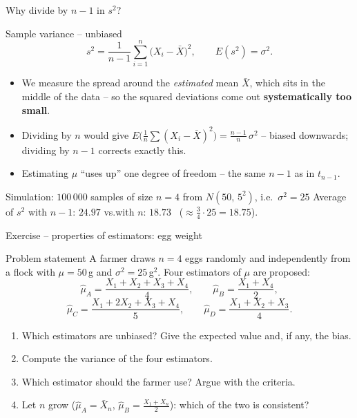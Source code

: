 \documentclass[aspectratio=169,11pt]{beamer}
\begin{document}
\begin{frame}{Why divide by $n-1$ in $s^2$?}
  \begin{block}{Sample variance -- unbiased}
    \[
      s^2=\frac{1}{n-1}\sum_{i=1}^n\bigl(X_i-\bar X\bigr)^2,
      \qquad E(s^2)=\sigma^2 .
    \]
  \end{block}
  \begin{itemize}\setlength{\itemsep}{2pt}
    \item We measure the spread around the \emph{estimated} mean $\bar X$,
          which sits in the middle of the data -- so the squared deviations
          come out \textbf{systematically too small}.
    \item Dividing by $n$ would give
          $E\bigl(\tfrac1n\sum(X_i-\bar X)^2\bigr)=\tfrac{n-1}{n}\,\sigma^2$
          -- biased downwards; dividing by $n-1$ corrects exactly this.
    \item Estimating $\mu$ ``uses up'' one degree of freedom -- the same $n-1$
          as in $t_{n-1}$.
  \end{itemize}
  \begin{exampleblock}{Simulation: $100\,000$ samples of size $n=4$ from
    $N(50,\,5^2)$, i.e.\ $\sigma^2=25$}
    Average of $s^2$ with $n-1$: $\mathbf{24.97}$ \quad vs.\quad with $n$:
    $\mathbf{18.73}$ \ ($\approx\tfrac34\cdot25=18.75$).
  \end{exampleblock}
\end{frame}

\begin{frame}{Exercise -- properties of estimators: egg weight}
  \begin{block}{Problem statement}
    A farmer draws $n=4$ eggs randomly and independently from a flock with
    $\mu=50$\,g and $\sigma^2=25$\,g$^2$. Four estimators of $\mu$ are
    proposed:
    \[
      \hat\mu_A=\frac{X_1+X_2+X_3+X_4}{4},\qquad
      \hat\mu_B=\frac{X_1+X_4}{2},
    \]
    \[
      \hat\mu_C=\frac{X_1+2X_2+X_3+X_4}{5},\qquad
      \hat\mu_D=\frac{X_1+X_2+X_3}{4}.
    \]
  \end{block}
  \begin{enumerate}\setlength{\itemsep}{2pt}
    \item[a)] Which estimators are unbiased? Give the expected value and, if
              any, the bias.
    \item[b)] Compute the variance of the four estimators.
    \item[c)] Which estimator should the farmer use? Argue with the criteria.
    \item[d)] Let $n$ grow ($\hat\mu_A=\bar X_n$, $\hat\mu_B=\tfrac{X_1+X_n}{2}$):
              which of the two is consistent?
  \end{enumerate}
\end{frame}
\end{document}
